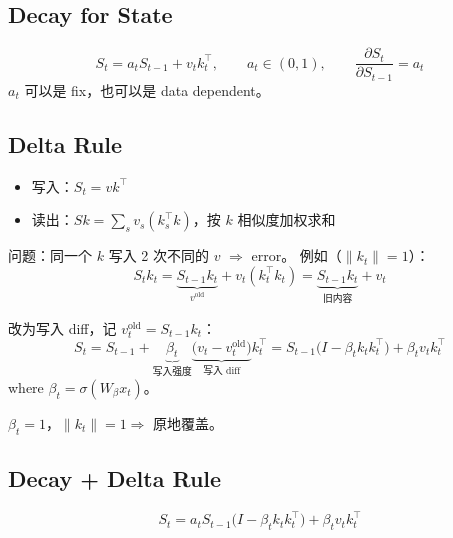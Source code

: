 \subsection{Decay for State}

\begin{equation}
  S_t = a_t S_{t-1} + v_t k_t^\top,
  \qquad a_t \in (0, 1),
  \qquad \frac{\partial S_t}{\partial S_{t-1}} = a_t
\end{equation}
$a_t$ 可以是 fix，也可以是 data dependent。

\subsection{Delta Rule}

\begin{itemize}
  \item 写入：$S_t = v k^\top$
  \item 读出：$S k = \sum_s v_s (k_s^\top k)$，按 $k$ 相似度加权求和
\end{itemize}

问题：同一个 $k$ 写入 2 次不同的 $v$ $\Rightarrow$ error。
例如（$\|k_t\| = 1$）：
\begin{equation}
  S_t k_t = \underbrace{S_{t-1} k_t}_{v^{\text{old}}} + v_t (k_t^\top k_t)
          = \underbrace{S_{t-1} k_t}_{\text{旧内容}} + v_t
\end{equation}

改为写入 diff，记 $v_t^{\text{old}} = S_{t-1} k_t$：
\begin{equation}
  S_t = S_{t-1} + \underbrace{\beta_t}_{\text{写入强度}}
        \underbrace{\bigl(v_t - v_t^{\text{old}}\bigr)}_{\text{写入 diff}} k_t^\top
      = S_{t-1}\bigl(I - \beta_t k_t k_t^\top\bigr) + \beta_t v_t k_t^\top
\end{equation}
where $\beta_t = \sigma(W_\beta x_t)$。

$\beta_t = 1$，$\|k_t\| = 1 \Rightarrow$ 原地覆盖。

\subsection{Decay + Delta Rule}

\begin{equation}
  S_t = a_t S_{t-1} \bigl(I - \beta_t k_t k_t^\top\bigr) + \beta_t v_t k_t^\top
\end{equation}
